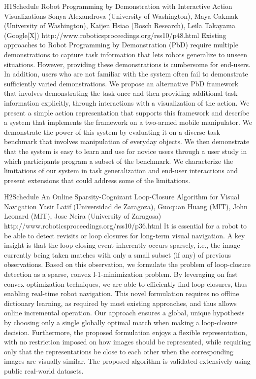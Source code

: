 \begin{spacing}{1.0}
\clearpage
\descriptionPaper
{H1}{Schedule}
{	
Robot Programming by Demonstration with Interactive Action Visualizations
}
{
Sonya Alexandrova (University of Washington), Maya Cakmak (University of Washington), Kaijen Hsiao (Bosch Research), Leila Takayama (Google[X])
}
{
http://www.roboticsproceedings.org/rss10/p48.html
}
{
Existing approaches to Robot Programming by Demonstration (PbD) require multiple demonstrations to capture task information that lets robots generalize to unseen situations. However, providing these demonstrations is cumbersome for end-users. In addition, users who are not familiar with the system often fail to demonstrate sufficiently varied demonstrations. We propose an alternative PbD framework that involves demonstrating the task once and then providing additional task information explicitly, through interactions with a visualization of the action. We present a simple action representation that supports this framework and describe a system that implements the framework on a two-armed mobile manipulator. We demonstrate the power of this system by evaluating it on a diverse task benchmark that involves manipulation of everyday objects. We then demonstrate that the system is easy to learn and use for novice users through a user study in which participants program a subset of the benchmark. We characterize the limitations of our system in task generalization and end-user interactions and present extensions that could address some of the limitations.
}




\descriptionPaper
{H2}{Schedule}
{	
An Online Sparsity-Cognizant Loop-Closure Algorithm for Visual Navigation
}
{
Yasir Latif (Universidad de Zaragoza), Guoquan Huang (MIT), John Leonard (MIT), Jose Neira (University of Zaragosa)
}
{
http://www.roboticsproceedings.org/rss10/p36.html
}
{
It is essential for a robot to be able to detect revisits or loop closures for long-term visual navigation. A key insight is that the loop-closing event inherently occurs sparsely, i.e., the image currently being taken matches with only a small subset (if any) of previous observations. Based on this observation, we formulate the problem of loop-closure detection as a sparse, convex l-1-minimization problem. By leveraging on fast convex optimization techniques, we are able to efficiently find loop closures, thus enabling real-time robot navigation. This novel formulation requires no offline dictionary learning, as required by most existing approaches, and thus allows online incremental operation. Our approach ensures a global, unique hypothesis by choosing only a single globally optimal match when making a loop-closure decision. Furthermore, the proposed formulation enjoys a flexible representation, with no restriction imposed on how images should be represented, while requiring only that the representations be close to each other when the corresponding images are visually similar. The proposed algorithm is validated extensively using public real-world datasets.
}



\end{spacing}
